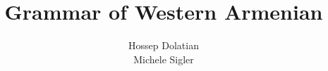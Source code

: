 \title{Grammar of Western Armenian}
 \author{Hossep Dolatian\\Michele Sigler}
\renewcommand{\lsSeries}{cgl}%
\renewcommand{\lsSeriesNumber}{}
